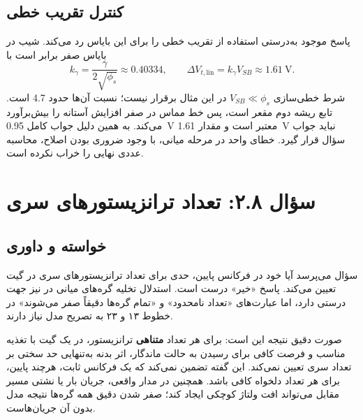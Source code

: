 \documentclass[12pt,a4paper]{article}
\newcommand{\exnum}[1]{\mbox{\beginL#1\endL}}
\newcommand{\reviewfile}[1]{\lr{\small\texttt{#1}}}
\begin{document}
\subsection*{کنترل تقریب خطی}
پاسخ موجود به‌درستی استفاده از تقریب خطی را برای این بایاس رد می‌کند. شیب در بایاس صفر برابر است با
\begin{equation}
 k_\gamma=\frac{\gamma}{2\sqrt{\phi_s}}\approx0.40334,
 \qquad \Delta V_{t,\mathrm{lin}}=k_\gamma V_{SB}\approx\qty{1.61}{\volt}.
 \label{eq:body-small-signal}
\end{equation}
شرط خطی‌سازی \(V_{SB}\ll\phi_s\) در این مثال برقرار نیست؛ نسبت آن‌ها حدود \num{4.7} است. تابع ریشه دوم مقعر است، پس خط مماس در صفر افزایش آستانه را بیش‌برآورد می‌کند. به همین دلیل جواب کامل \qty{0.95}{\volt} معتبر است و مقدار \qty{1.61}{\volt} نباید جواب سؤال قرار گیرد. خطای واحد در مرحله میانی، با وجود ضروری بودن اصلاح، محاسبه عددی نهایی را خراب نکرده است.

\section*{سؤال \exnum{۲.۸}: تعداد ترانزیستورهای سری}
\subsection*{خواسته و داوری}
سؤال می‌پرسد آیا خود  در فرکانس پایین، حدی برای تعداد ترانزیستورهای سری در گیت  تعیین می‌کند. پاسخ «خیر» درست است. استدلال تخلیه گره‌های میانی در \reviewfile{2/solutions/2-8.tex} نیز جهت درستی دارد، اما عبارت‌های «تعداد نامحدود» و «تمام گره‌ها دقیقاً صفر می‌شوند» در خطوط ۱۳ و ۲۳ به تصریح مدل نیاز دارند.

صورت دقیق نتیجه این است: برای هر تعداد \textbf{متناهی} ترانزیستور، در یک گیت  با تغذیه مناسب و فرصت کافی برای رسیدن به حالت ماندگار، اثر بدنه به‌تنهایی حد سختی بر تعداد سری تعیین نمی‌کند. این گفته تضمین نمی‌کند که یک فرکانس ثابت، هرچند پایین، برای هر تعداد دلخواه کافی باشد. همچنین در مدار واقعی، جریان بار یا نشتی مسیر مقابل می‌تواند افت ولتاژ کوچکی ایجاد کند؛ صفر شدن دقیق همه گره‌ها نتیجه مدل بدون آن جریان‌هاست.
\end{document}
